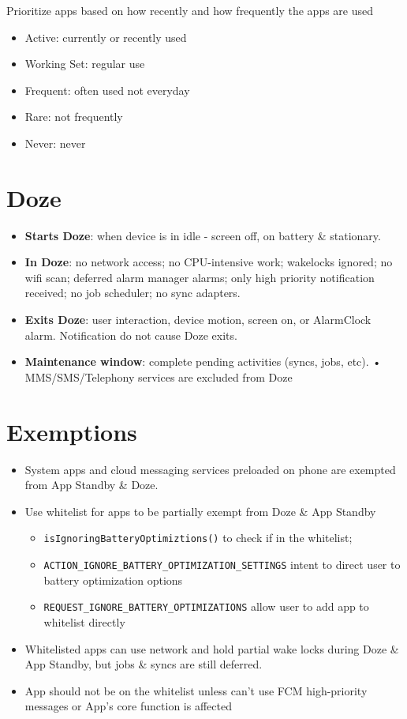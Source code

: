 \documentclass{article}
\begin{document}
\begin{flushleft}
Prioritize apps based on how recently and how frequently the apps are used
\begin{itemize}
  \item Active: currently or recently used 
  \item Working Set: regular use 
  \item Frequent: often used not everyday 
  \item Rare: not frequently 
  \item Never: never
\end{itemize}

\section{Doze}

\begin{itemize}
  \item \textbf{Starts Doze}: when device is in idle - screen off, on battery \& stationary. 
  \item \textbf{In Doze}: no network access; no CPU-intensive work; wakelocks ignored; no wifi scan; deferred alarm manager alarms; only high priority notification received; no job scheduler; no sync adapters. 
  \item \textbf{Exits Doze}: user interaction, device motion, screen on, or AlarmClock alarm. Notification do not cause Doze exits. 
  \item \textbf{Maintenance window}: complete pending activities (syncs, jobs, etc). • MMS/SMS/Telephony services are excluded from Doze
\end{itemize}

\section{Exemptions}

\begin{itemize}
  \item System apps and cloud messaging services preloaded on phone are exempted from App Standby \& Doze. 
  \item Use whitelist for apps to be partially exempt from Doze \& App Standby
  \begin{itemize}
    \item \verb|isIgnoringBatteryOptimiztions()| to check if in the whitelist;
    \item \verb|ACTION_IGNORE_BATTERY_OPTIMIZATION_SETTINGS| intent to direct user to battery optimization options 
    \item \verb|REQUEST_IGNORE_BATTERY_OPTIMIZATIONS| allow user to add app to whitelist directly 
  \end{itemize}
  \item Whitelisted apps can use network and hold partial wake locks during Doze \& App Standby, but jobs \& syncs are still deferred. 
  \item App should not be on the whitelist unless can’t use FCM high-priority messages or App’s core function is affected
\end{itemize}

\end{flushleft}
\end{document}
